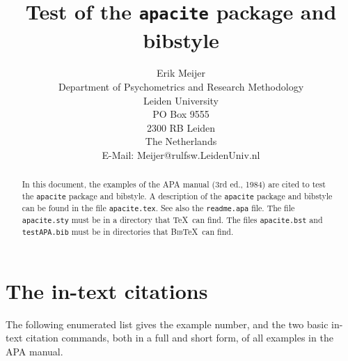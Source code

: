 \documentclass[12pt,a4paper]{article}
\title{Test of the \texttt{apacite} package and bibstyle}
\author{Erik Meijer\\
        Department of Psychometrics and Research Methodology\\
        Leiden University\\
        PO Box 9555\\
        2300 RB Leiden\\
        The Netherlands\\
        E-Mail: Meijer@rulfsw.LeidenUniv.nl
}
\begin{document}
\maketitle
\begin{abstract}
   In this document, the examples of the APA manual (3rd ed., 1984)
   are cited to test the \texttt{apacite} package and bibstyle. 
   A description of the \texttt{apacite} package and bibstyle can be found
   in the file \texttt{apacite.tex}. See also the \texttt{readme.apa} file.
   The file \texttt{apacite.sty} must be in a directory that \TeX\ can find.
   The files \texttt{apacite.bst} and \texttt{testAPA.bib} must be in directories
   that \textsc{Bib}\TeX\ can find.
\end{abstract}
\section{The in-text citations}
The following enumerated list gives the example number, and
the two basic in-text citation commands, both in a full and
short form, of all examples in the APA manual. 
\end{document}
